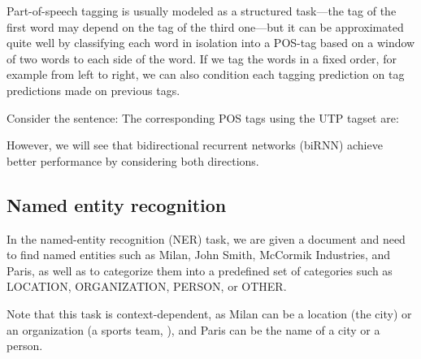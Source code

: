Part-of-speech tagging is usually modeled as a structured task---the tag of the first word may depend on the tag of the third one---but it can be approximated quite well by classifying each word in isolation into a POS-tag based on a window of two words to each side of the word. If we tag the words in a fixed order, for example from left to right, we can also condition each tagging prediction on tag predictions made on previous tags.

\begin{example}{}
    Consider the sentence:
    The corresponding POS tags using the UTP tagset are:
\end{example}

However, we will see that bidirectional recurrent networks (biRNN) achieve better performance by considering both directions.

\subsection{Named entity recognition}
In the named-entity recognition (NER) task, we are given a document and need to find named entities such as Milan, John Smith, McCormik Industries, and Paris, as well as to categorize them into a predefined set of categories such as LOCATION, ORGANIZATION, PERSON, or OTHER.

\begin{note}{}
    Note that this task is context-dependent, as Milan can be a location (the city) or an organization (a sports team, ), and Paris can be the name of a city or a person.
\end{note}{}

